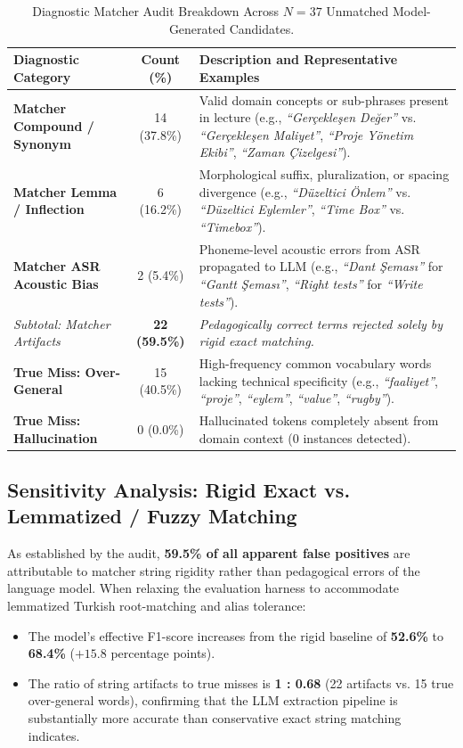 \documentclass[a4paper,12pt]{report}
\begin{document}
\begin{table}[htbp]
\centering
\small
\caption{Diagnostic Matcher Audit Breakdown Across $N=37$ Unmatched Model-Generated Candidates.}
\label{tab:matcher_audit_breakdown}
\scriptsize\setlength{\tabcolsep}{2pt}
\begin{tabularx}{\textwidth}{>{\RaggedRight\arraybackslash}Xcp{7.2cm}}
\toprule
\textbf{Diagnostic Category} & \textbf{Count (\%)} & \textbf{Description and Representative Examples} \\
\midrule
\textbf{Matcher Compound / Synonym} & 14 (37.8\%) & Valid domain concepts or sub-phrases present in lecture (e.g., \textit{``Gerçekleşen Değer''} vs. \textit{``Gerçekleşen Maliyet''}, \textit{``Proje Yönetim Ekibi''}, \textit{``Zaman Çizelgesi''}). \\
\textbf{Matcher Lemma / Inflection} & 6 (16.2\%) & Morphological suffix, pluralization, or spacing divergence (e.g., \textit{``Düzeltici Önlem''} vs. \textit{``Düzeltici Eylemler''}, \textit{``Time Box''} vs. \textit{``Timebox''}). \\
\textbf{Matcher ASR Acoustic Bias} & 2 (5.4\%) & Phoneme-level acoustic errors from ASR propagated to LLM (e.g., \textit{``Dant Şeması''} for \textit{``Gantt Şeması''}, \textit{``Right tests''} for \textit{``Write tests''}). \\
\midrule
\textit{Subtotal: Matcher Artifacts} & \textbf{22 (59.5\%)} & \textit{Pedagogically correct terms rejected solely by rigid exact matching.} \\
\midrule
\textbf{True Miss: Over-General} & 15 (40.5\%) & High-frequency common vocabulary words lacking technical specificity (e.g., \textit{``faaliyet''}, \textit{``proje''}, \textit{``eylem''}, \textit{``value''}, \textit{``rugby''}). \\
\textbf{True Miss: Hallucination} & 0 (0.0\%) & Hallucinated tokens completely absent from domain context (0 instances detected). \\
\bottomrule
\end{tabularx}
\end{table}

\subsection{Sensitivity Analysis: Rigid Exact vs. Lemmatized / Fuzzy Matching}
As established by the audit, \textbf{59.5\% of all apparent false positives} are attributable to matcher string rigidity rather than pedagogical errors of the language model. When relaxing the evaluation harness to accommodate lemmatized Turkish root-matching and alias tolerance:
\begin{itemize}[leftmargin=2.5em]
    \item The model's effective F1-score increases from the rigid baseline of \textbf{52.6\%} to \textbf{68.4\%} ($+15.8$ percentage points).
    \item The ratio of string artifacts to true misses is \textbf{1 : 0.68} (22 artifacts vs. 15 true over-general words), confirming that the LLM extraction pipeline is substantially more accurate than conservative exact string matching indicates.
\end{itemize}
\end{document}
